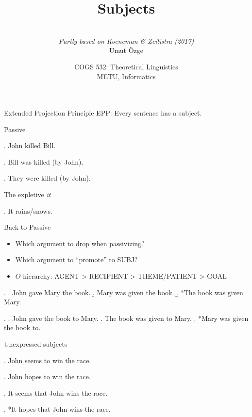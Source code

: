 \documentclass[ignorenonframetext,10pt,aspectratio=169]{beamer}
\title{Subjects}
\author{\  \\  {\it Partly based on Koeneman \& Zeiljstra (2017)} \\ \vspace{20pt} Umut \"Ozge\\  }
\date{COGS 532: Theoretical Linguistics\\ METU, Informatics}
\begin{document}
\begin{frame}\frametitle{}
\thispagestyle{empty}
\maketitle
\end{frame}

\begin{frame}[t,plain]{}

\end{frame}

\begin{frame}[t,plain]{Extended Projection Principle}
\vspace{50pt}
EPP: Every sentence has a subject.

\end{frame}

\begin{frame}[t,plain]{Passive}


\ex. John killed Bill.

\ex. Bill \alert{was} killed (by John).

\ex. They \alert{were} killed (by John).

\end{frame}

\begin{frame}[t,plain]{The expletive {\it it}}

\ex. It rains/snows.

\end{frame}

\begin{frame}[t,plain]{Back to Passive}

\begin{itemize}

\item Which argument to drop when passivizing?
\item Which argument to ``promote'' to SUBJ?
\pause
\item $\Theta$-hierarchy: AGENT > RECIPIENT > THEME/PATIENT > GOAL
\end{itemize}


\ex.
\a. John gave Mary the book.
\b. Mary was given the book.
\b. *The book was given Mary.

\ex.
\a. John gave the book to Mary.
\b. The book was given to Mary. 
\b. *Mary was given the book to.

\end{frame}

\begin{frame}[t,plain]{Unexpressed subjects}

\ex. John seems to win the race.

\ex. John hopes to win the race.

\pause
\vspace{10pt}
\ex. It seems that John wins the race.

\ex. *It hopes that John wins the race.


\end{frame}
\end{document}
